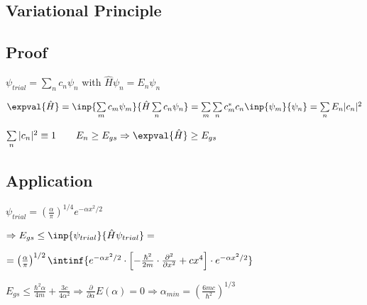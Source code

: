 \documentclass[10pt,a4paper]{scrartcl}
\begin{document}
\begin{multicols*}{3}
	\section{Variational Principle}
	
	
	\subsection{Proof}
	
	$\psi_{trial}=\sum\limits_n{c_n\psi_n}$ with $\hat{H}\psi_n=E_n\psi_n$
	
	$\expval{\hat{H}}=\inp{\sum\limits_m{c_m\psi_m}}{\hat{H}\sum\limits_n{c_n\psi_n}}=\sum\limits_m\sum\limits_n{c_m^\ast c_n\inp{\psi_m}{\psi_n}}=\sum\limits_n{E_n|c_n|^2}$
	
	$\sum\limits_n|c_n|^2 \equiv 1 \qquad E_n\geq E_{gs}\Rightarrow \expval{\hat{H}}\geq E_{gs}$
	
	\subsection{Application}
	
	$\psi_{trial}=\left(\frac{\alpha}{\pi}\right)^{1/4}e^{-\alpha x^2/2}$
	
	$\Rightarrow E_{gs}\leq \inp{\psi_{trial}}{\hat{H}\psi_{trial}}=$
	
	$=\left(\frac{\alpha}{\pi}\right)^{1/2}\intinf{e^{-\alpha x^2/2}\cdot\left[-\frac{\hbar^2}{2m}\cdot\frac{\partial^2}{\partial x^2}+cx^4\right]\cdot e^{-\alpha x^2/2}}$
	
	$E_{gs}\leq \frac{\hbar^2\alpha}{4m}+\frac{3c}{4\alpha^2}\Rightarrow \frac{\partial}{\partial \alpha}E(\alpha)=0\Rightarrow \alpha_{min}=\left(\frac{6mc}{\hbar^2}\right)^{1/3}$
	
	
\end{multicols*}
\end{document}
